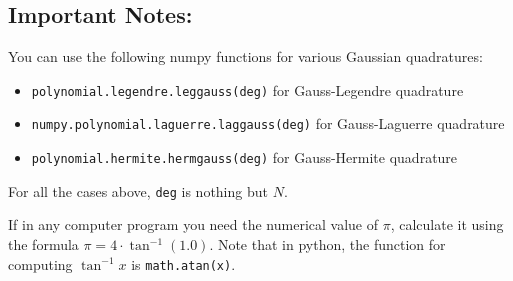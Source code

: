 \documentclass{article}
\begin{document}
\subsection*{Important Notes:}
You can use the following numpy functions for various Gaussian quadratures:
\begin{itemize}
    \item \texttt{polynomial.legendre.leggauss(deg)} for Gauss-Legendre quadrature
    \item \texttt{numpy.polynomial.laguerre.laggauss(deg)} for Gauss-Laguerre quadrature
    \item \texttt{polynomial.hermite.hermgauss(deg)} for Gauss-Hermite quadrature
\end{itemize}
For all the cases above, \texttt{deg} is nothing but $N$.

If in any computer program you need the numerical value of $\pi$, calculate it using the formula $\pi = 4\cdot\tan^{-1}(1.0)$. Note that in python, the function for computing $\tan^{-1}x$ is \texttt{math.atan(x)}.
\end{document}
